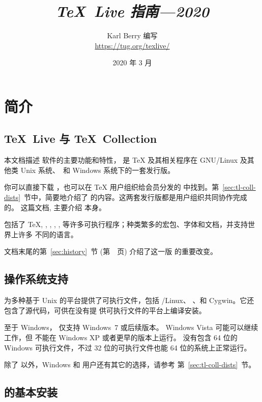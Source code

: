 \documentclass{article}
\title{%
  {\huge \textit{\TeX\ Live 指南---2020}}%
}
\author{Karl Berry 编写 \\[3mm]
        \url{https://tug.org/texlive/}
       }
\date{2020 年 3 月}
\begin{document}
\maketitle

\begin{multicols}{2}
\tableofcontents
\end{multicols}

\section{简介}
\label{sec:intro}

\subsection{\protect\TeX\protect\ Live 与 \protect\TeX\protect\ Collection}

本文档描述 \TL{} 软件的主要功能和特性，\TL{} 是 \TeX{} 及其相关程序在
GNU/Linux 及其他类 Unix 系统、\MacOSX\ 和 Windows
系统下的一套发行版。

你可以直接下载 \TL{}，也可以在 \TeX{} 用户组织给会员分发的 \TK{}
\DVD 中找到。第~\ref{sec:tl-coll-dists}~节中，简要地介绍了
\DVD 的内容。这两套发行版都是用户组织共同协作完成的。
这篇文档, 主要介绍 \TL{} 本身。

\TL{} 包括了 \TeX{}, \LaTeXe{}, \ConTeXt, \MF, \MP, \BibTeX{}
等许多可执行程序；种类繁多的宏包、字体和文档，并支持世界上许多
不同的语言。

文档末尾的第~\ref{sec:history}~节 (第~\pageref{sec:history}~页)
介绍了这一版 \TL{} 的重要改变。

\subsection{操作系统支持}
\label{sec:os-support}

\TL{} 为多种基于 Unix 的平台提供了可执行文件，包括 \GNU/Linux、
\MacOSX{}、和 Cygwin。它还包含了源代码，可供在没有提
供可执行文件的平台上编译安装。

至于 Windows，\TL{} 仅支持 Windows~7 或后续版本。
Windows Vista 可能可以继续工作，但 \TL{} 不能在 Windows XP
或者更早的版本上运行。\TL{} 没有包含 64 位的 Windows
可执行文件，不过 32 位的可执行文件也能 64 位的系统上正常运行。

除了 \TL{} 以外，Windows 和 \MacOSX 用户还有其它的选择，请参考
第~\ref{sec:tl-coll-dists}~节。

\subsection{\protect\TL{} 的基本安装}
\label{sec:basic}
\end{document}
